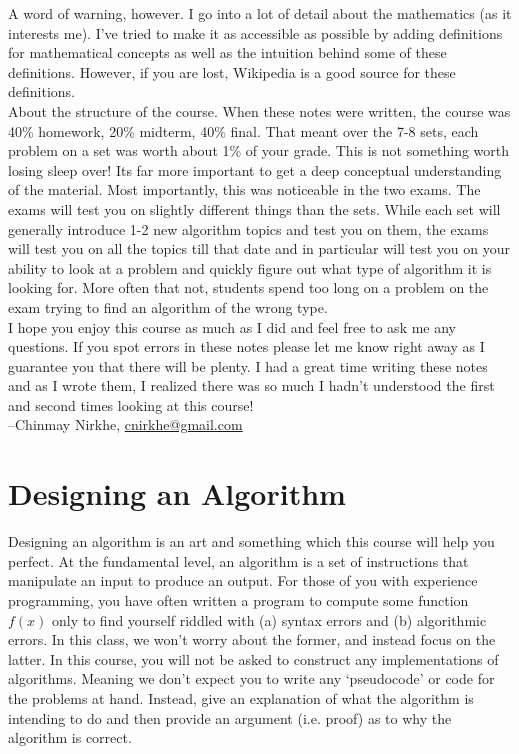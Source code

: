\documentclass[11pt]{article}
\theoremstyle{plain}
\theoremstyle{definition}
\numberwithin{equation}{section}
\numberwithin{figure}{section}
\begin{document}
\noindent A word of warning, however. I go into a lot of detail about the mathematics (as it interests me). I've tried to make it as accessible as possible by adding definitions for mathematical concepts as well as the intuition behind some of these definitions. However, if you are lost, Wikipedia is a good source for these definitions. \\

\noindent About the structure of the course. When these notes were written, the course was 40\% homework, 20\% midterm, 40\% final. That meant over the 7-8 sets, each problem on a set was worth about 1\% of your grade. This is not something worth losing sleep over! Its far more important to get a deep conceptual understanding of the material. Most importantly, this was noticeable in the two exams. The exams will test you on slightly different things than the sets. While each set will generally introduce 1-2 new algorithm topics and test you on them, the exams will test you on all the topics till that date and in particular will test you on your ability to look at a problem and quickly figure out what type of algorithm it is looking for. More often that not, students spend too long on a problem on the exam trying to find an algorithm of the wrong type. \\

\noindent I hope you enjoy this course as much as I did and feel free to ask me any questions. If you spot errors in these notes please let me know right away as I guarantee you that there will be plenty. I had a great time writing these notes and as I wrote them, I realized there was so much I hadn't understood the first and second times looking at this course! \\

\noindent --Chinmay Nirkhe, \href{mailto:cnirkhe@gmail.com}{cnirkhe@gmail.com}


\newpage

\section{Designing an Algorithm}

\noindent Designing an algorithm is an art and something which this course will help you perfect. At the fundamental level, an algorithm is a set of instructions that manipulate an input to produce an output. For those of you with experience programming, you have often written a program to compute some function $f(x)$ only to find yourself riddled with (a) syntax errors and (b) algorithmic errors. In this class, we won't worry about the former, and instead focus on the latter. In this course, you will not be asked to construct any implementations of algorithms. Meaning we don't expect you to write any `pseudocode' or code for the problems at hand. Instead, give an explanation of what the algorithm is intending to do and then provide an argument (i.e. proof) as to why the algorithm is correct. \\
\end{document}
